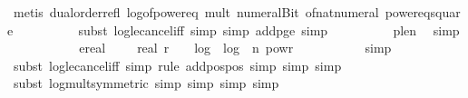\begin{isabellebody}
\ {\isacharparenleft}{\kern0pt}metis\ dual{\isacharunderscore}{\kern0pt}order{\isachardot}{\kern0pt}refl\ log{}{\isacharunderscore}{\kern0pt}of{\isacharunderscore}{\kern0pt}power{\isacharunderscore}{\kern0pt}eq\ mult{\isacharunderscore}{\kern0pt}{}\ numeral{\isacharunderscore}{\kern0pt}Bit{}\ of{\isacharunderscore}{\kern0pt}nat{\isacharunderscore}{\kern0pt}numeral\ power{}{\isacharunderscore}{\kern0pt}eq{\isacharunderscore}{\kern0pt}square{\isacharparenright}{\kern0pt}\isanewline
\ \ \ \ \ \ \ \ \isamarkupfalse%
\ {\isacharparenleft}{\kern0pt}subst\ log{\isacharunderscore}{\kern0pt}le{\isacharunderscore}{\kern0pt}cancel{\isacharunderscore}{\kern0pt}iff{\isacharcomma}{\kern0pt}\ simp{\isacharcomma}{\kern0pt}\ simp\ add{\isacharcolon}{\kern0pt}p{\isacharunderscore}{\kern0pt}ge{\isacharunderscore}{\kern0pt}{}{\isacharcomma}{\kern0pt}\ simp{\isacharparenright}{\kern0pt}\isanewline
\ \ \ \ \ \ \ \ \isamarkupfalse%
\ p{\isacharunderscore}{\kern0pt}le{\isacharunderscore}{\kern0pt}n\ \isamarkupfalse%
\ simp\isanewline
\ \ \ \ \ \ \isamarkupfalse%
\ \isamarkupfalse%
\ {\isachardoublequoteopen}{\isachardot}{\kern0pt}{\isachardot}{\kern0pt}{\isachardot}{\kern0pt}\ {\isasymle}\ ereal\ {\isacharparenleft}{\kern0pt}{}\ {\isacharplus}{\kern0pt}\ {}\ {\isacharasterisk}{\kern0pt}\ real\ r\ {\isacharplus}{\kern0pt}\ {}\ {\isacharasterisk}{\kern0pt}\ log\ {}\ {\isacharparenleft}{\kern0pt}log\ {}\ {\isacharparenleft}{\kern0pt}{\isacharparenleft}{\kern0pt}n{\isacharplus}{\kern0pt}{}{\isacharparenright}{\kern0pt}\ powr\ {}{\isacharparenright}{\kern0pt}{\isacharparenright}{\kern0pt}{\isacharparenright}{\kern0pt}{\isachardoublequoteclose}\isanewline
\ \ \ \ \ \ \ \ \isamarkupfalse%
\ simp\isanewline
\ \ \ \ \ \ \ \ \isamarkupfalse%
\ {\isacharparenleft}{\kern0pt}subst\ log{\isacharunderscore}{\kern0pt}le{\isacharunderscore}{\kern0pt}cancel{\isacharunderscore}{\kern0pt}iff{\isacharcomma}{\kern0pt}\ simp{\isacharcomma}{\kern0pt}\ rule\ add{\isacharunderscore}{\kern0pt}pos{\isacharunderscore}{\kern0pt}pos{\isacharcomma}{\kern0pt}\ simp{\isacharcomma}{\kern0pt}\ simp{\isacharcomma}{\kern0pt}\ simp{\isacharparenright}{\kern0pt}\isanewline
\ \ \ \ \ \ \ \ \isamarkupfalse%
\ {\isacharparenleft}{\kern0pt}subst\ log{\isacharunderscore}{\kern0pt}mult{\isacharbrackleft}{\kern0pt}symmetric{\isacharbrackright}{\kern0pt}{\isacharcomma}{\kern0pt}\ simp{\isacharcomma}{\kern0pt}\ simp{\isacharcomma}{\kern0pt}\ simp{\isacharcomma}{\kern0pt}\ simp{\isacharparenright}{\kern0pt}\isanewline

\end{isabellebody}
